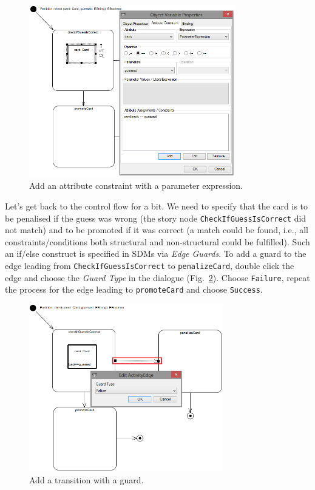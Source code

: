 \begin{figure}[htbp]
\begin{center}
  \includegraphics[width=0.8\textwidth]{pics/sdmBilder/check/sdm18RAW}
  \caption{Add an attribute constraint with a parameter expression.}
  \label{fig:sdm_check_att_constraint}
\end{center}
\end{figure}

Let's get back to the control flow for a bit.  We need to specify that the card
is to be penalised if the guess was wrong (the story node
\texttt{Check\-If\-Guess\-Is\-Correct} did not match) and to be promoted if it
was correct (a match could be found, i.e., all constraints/conditions both
structural and non-structural could be fulfilled).  Such an if/else construct is
specified in SDMs via \emph{Edge Guards}.  To add a guard to the edge leading
from \texttt{Check\-If\-Guess\-Is\-Correct} to \texttt{penalize\-Card}, double
click the edge and choose the \emph{Guard Type} in the dialogue
(Fig.~\ref{fig:sdm_check_guard}).  Choose \texttt{Failure}, repeat the process
for the edge leading to \texttt{promoteCard} and choose \texttt{Success}.

\begin{figure}[htbp]
\begin{center}
  \includegraphics[width=0.75\textwidth]{pics/sdmBilder/check/sdm19}
  \caption{Add a transition with a guard.}
  \label{fig:sdm_check_guard}
\end{center}
\end{figure}


